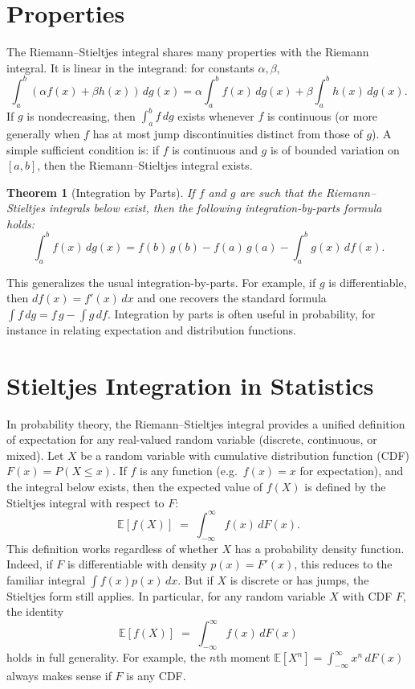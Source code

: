 \documentclass[11pt,a4paper]{article}
\newtheorem{theorem}{Theorem}[section]
\begin{document}
\section{Properties}
The Riemann--Stieltjes integral shares many properties with the Riemann integral.  It is linear in the integrand: for constants $\alpha,\beta$,
\[
\int_a^b (\alpha f(x) + \beta h(x))\,dg(x) = \alpha\int_a^b f(x)\,dg(x) + \beta\int_a^b h(x)\,dg(x).
\]
If $g$ is nondecreasing, then $\int_a^b f\,dg$ exists whenever $f$ is continuous (or more generally when $f$ has at most jump discontinuities distinct from those of $g$).  A simple sufficient condition is: if $f$ is continuous and $g$ is of bounded variation on $[a,b]$, then the Riemann--Stieltjes integral exists.

\begin{theorem}[Integration by Parts]
If $f$ and $g$ are such that the Riemann--Stieltjes integrals below exist, then the following integration-by-parts formula holds:
\[
\int_a^b f(x)\,dg(x)
= f(b)\,g(b) - f(a)\,g(a) - \int_a^b g(x)\,df(x).
\]
\end{theorem}
\noindent This generalizes the usual integration-by-parts.  For example, if $g$ is differentiable, then $df(x)=f'(x)\,dx$ and one recovers the standard formula $\int f\,dg = f\,g - \int g\,df$.  Integration by parts is often useful in probability, for instance in relating expectation and distribution functions.

\section{Stieltjes Integration in Statistics}
In probability theory, the Riemann--Stieltjes integral provides a unified definition of expectation for any real-valued random variable (discrete, continuous, or mixed).  Let $X$ be a random variable with cumulative distribution function (CDF) $F(x)=P(X\le x)$.  If $f$ is any function (e.g.\ $f(x)=x$ for expectation), and the integral below exists, then the expected value of $f(X)$ is defined by the Stieltjes integral with respect to $F$:
\[
\mathbb{E}[f(X)] \;=\; \int_{-\infty}^\infty f(x)\,dF(x).
\]
This definition works regardless of whether $X$ has a probability density function.  Indeed, if $F$ is differentiable with density $p(x)=F'(x)$, this reduces to the familiar integral $\int f(x)p(x)\,dx$.  But if $X$ is discrete or has jumps, the Stieltjes form still applies.  In particular, for any random variable $X$ with CDF $F$, the identity 
\[
\mathbb{E}[f(X)] \;=\; \int_{-\infty}^\infty f(x)\,dF(x)
\]
holds in full generality.  For example, the $n$th moment $\mathbb{E}[X^n]=\int_{-\infty}^\infty x^n\,dF(x)$ always makes sense if $F$ is any CDF.
\end{document}
